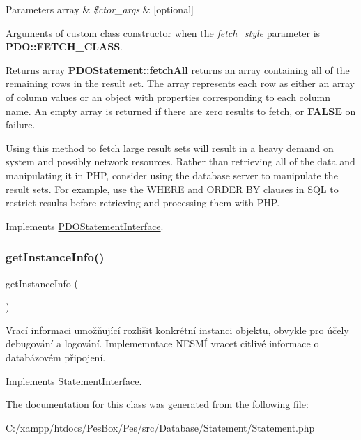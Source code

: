 \begin{DoxyParams}[1]{Parameters}
array & {\em \$ctor\+\_\+args} & \mbox{[}optional\mbox{]} \\
\hline
\end{DoxyParams}
Arguments of custom class constructor when the {\itshape fetch\+\_\+style} parameter is {\bfseries P\+D\+O\+::\+F\+E\+T\+C\+H\+\_\+\+C\+L\+A\+SS}. 

\begin{DoxyReturn}{Returns}
array {\bfseries P\+D\+O\+Statement\+::fetch\+All} returns an array containing all of the remaining rows in the result set. The array represents each row as either an array of column values or an object with properties corresponding to each column name. An empty array is returned if there are zero results to fetch, or {\bfseries F\+A\+L\+SE} on failure. 
\end{DoxyReturn}


Using this method to fetch large result sets will result in a heavy demand on system and possibly network resources. Rather than retrieving all of the data and manipulating it in P\+HP, consider using the database server to manipulate the result sets. For example, use the W\+H\+E\+RE and O\+R\+D\+ER BY clauses in S\+QL to restrict results before retrieving and processing them with P\+HP. 

Implements \mbox{\hyperlink{interface_pes_1_1_database_1_1_statement_1_1_p_d_o_statement_interface_a5721d6df319aed83538605d4c6486947}{P\+D\+O\+Statement\+Interface}}.

\mbox{\label{class_pes_1_1_database_1_1_statement_1_1_statement_ad86fa5498ac1054e414a91fa4a6a7dfd}} 
\subsubsection{\texorpdfstring{get\+Instance\+Info()}{getInstanceInfo()}}
{\footnotesize\ttfamily get\+Instance\+Info (\begin{DoxyParamCaption}{ }\end{DoxyParamCaption})}

Vrací informaci umožňující rozlišit konkrétní instanci objektu, obvykle pro účely debugování a logování. Implememntace N\+E\+S\+MÍ vracet citlivé informace o databázovém připojení. 

Implements \mbox{\hyperlink{interface_pes_1_1_database_1_1_statement_1_1_statement_interface_ad86fa5498ac1054e414a91fa4a6a7dfd}{Statement\+Interface}}.



The documentation for this class was generated from the following file\+:\begin{DoxyCompactItemize}
\item 
C\+:/xampp/htdocs/\+Pes\+Box/\+Pes/src/\+Database/\+Statement/Statement.\+php\end{DoxyCompactItemize}
